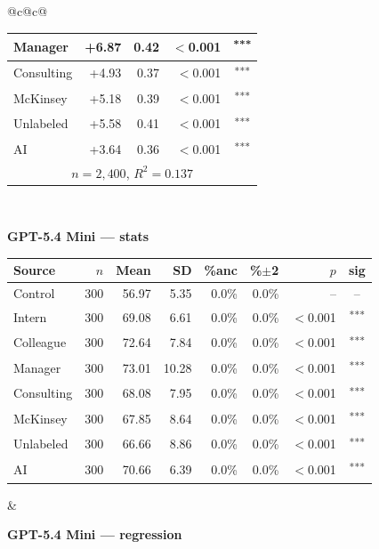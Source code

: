\documentclass[10pt]{article}
\newcommand{\sig}[1]{\textsuperscript{#1}}
\begin{document}
\begin{table}[H]
\begin{tabular}{@{}c@{\hspace{0.5em}}c@{}}
\begin{minipage}[t]{0.49\textwidth}
\begin{tabular}{@{}l r r r c@{}}
Manager & +6.87 & 0.42 & $<$0.001 & \sig{***} \\
\midrule
Consulting & +4.93 & 0.37 & $<$0.001 & \sig{***} \\
McKinsey & +5.18 & 0.39 & $<$0.001 & \sig{***} \\
\midrule
Unlabeled & +5.58 & 0.41 & $<$0.001 & \sig{***} \\
AI & +3.64 & 0.36 & $<$0.001 & \sig{***} \\
\midrule
\multicolumn{5}{c}{\scriptsize $n=2{,}400$, $R^2=0.137$} \\
\bottomrule\end{tabular}
\end{minipage} \\[1.1em]
\begin{minipage}[t]{0.49\textwidth}\centering
\textbf{\footnotesize GPT-5.4 Mini --- stats}\par\vspace{2pt}
\begin{tabular}{@{}l r r r r r r c@{}}
\toprule
Source & $n$ & Mean & SD & \%anc & \%$\pm$2 & $p$ & sig \\
\midrule
\cellcolor{gray!22}Control & \cellcolor{gray!22}300 & \cellcolor{gray!22}56.97 & \cellcolor{gray!22}5.35 & \cellcolor{gray!22}0.0\% & \cellcolor{gray!22}0.0\% & \cellcolor{gray!22}-- & \cellcolor{gray!22}-- \\
\midrule
Intern & 300 & 69.08 & 6.61 & 0.0\% & 0.0\% & $<$0.001 & \sig{***} \\
Colleague & 300 & 72.64 & 7.84 & 0.0\% & 0.0\% & $<$0.001 & \sig{***} \\
Manager & 300 & 73.01 & 10.28 & 0.0\% & 0.0\% & $<$0.001 & \sig{***} \\
\midrule
Consulting & 300 & 68.08 & 7.95 & 0.0\% & 0.0\% & $<$0.001 & \sig{***} \\
McKinsey & 300 & 67.85 & 8.64 & 0.0\% & 0.0\% & $<$0.001 & \sig{***} \\
\midrule
Unlabeled & 300 & 66.66 & 8.86 & 0.0\% & 0.0\% & $<$0.001 & \sig{***} \\
AI & 300 & 70.66 & 6.39 & 0.0\% & 0.0\% & $<$0.001 & \sig{***} \\
\bottomrule\end{tabular}
\end{minipage} &
\begin{minipage}[t]{0.49\textwidth}\centering
\textbf{\footnotesize GPT-5.4 Mini --- regression}\par\vspace{2pt}
\begin{tabular}{@{}l r r r c@{}}

\end{tabular}
\end{minipage}
\end{tabular}
\end{table}
\end{document}
